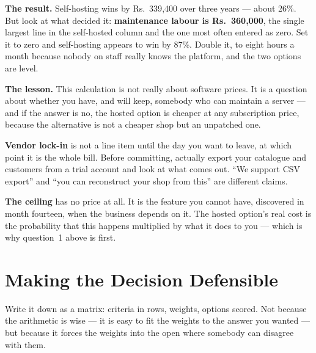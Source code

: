 \begin{worked}
\smallskip
\textbf{The result.} Self-hosting wins by Rs.~339{,}400 over three years ---
about 26\%. But look at what decided it: \textbf{maintenance labour is
Rs.~360{,}000}, the single largest line in the self-hosted column and the one
most often entered as zero. Set it to zero and self-hosting appears to win by
87\%. Double it, to eight hours a month because nobody on staff really knows
the platform, and the two options are level.

\smallskip
\textbf{The lesson.} This calculation is not really about software prices. It
is a question about whether you have, and will keep, somebody who can maintain
a server --- and if the answer is no, the hosted option is cheaper at any
subscription price, because the alternative is not a cheaper shop but an
unpatched one.
\end{worked}

\begin{alertbox}
\textbf{Vendor lock-in} is not a line item until the day you want to leave, at
which point it is the whole bill. Before committing, actually export your
catalogue and customers from a trial account and look at what comes out. ``We
support CSV export'' and ``you can reconstruct your shop from this'' are
different claims.

\smallskip
\textbf{The ceiling} has no price at all. It is the feature you cannot have,
discovered in month fourteen, when the business depends on it. The hosted
option's real cost is the probability that this happens multiplied by what it
does to you --- which is why question~1 above is first.
\end{alertbox}

\section{Making the Decision Defensible}

Write it down as a matrix: criteria in rows, weights, options scored. Not
because the arithmetic is wise --- it is easy to fit the weights to the answer
you wanted --- but because it forces the weights into the open where somebody
can disagree with them.

